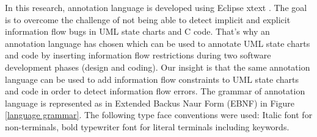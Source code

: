 In this research, annotation language is developed using Eclipse xtext \cite{ref_17_xtext:grammar}. The goal is to overcome the challenge of not being able to detect implicit and explicit information flow bugs in UML state charts and C code. That's why an annotation language has chosen
which can be used to annotate UML state charts and code by inserting information flow
restrictions during two software development phases (design
and coding). Our insight is that the same annotation language
can be used to add information flow constraints to UML state
charts and code in order to detect information flow errors. The grammar of annotation language is represented as in Extended Backus Naur Form (EBNF) in Figure \ref{language grammar}. The following type face conventions were used: Italic font for non-terminals, bold typewriter font for literal terminals including keywords.\\
 
